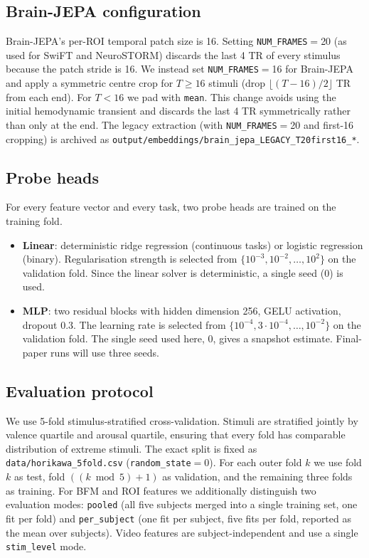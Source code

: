 \documentclass[11pt, a4paper]{article}
\newcommand{\fefn}[1]{\texttt{\small #1}}
\begin{document}
\subsection{Brain-JEPA configuration}
\label{sec:bjnote}

Brain-JEPA's per-ROI temporal patch size is 16. Setting \texttt{NUM\_FRAMES}$=$20 (as used
for SwiFT and NeuroSTORM) discards the last 4 TR of every stimulus because the patch
stride is 16. We instead set \texttt{NUM\_FRAMES}$=$16 for Brain-JEPA and apply a
symmetric centre crop for $T \geq 16$ stimuli (drop $\lfloor (T-16)/2 \rfloor$ TR from
each end). For $T < 16$ we pad with \texttt{mean}. This change avoids using the initial
hemodynamic transient and discards the last 4 TR symmetrically rather than only at the
end. The legacy extraction (with \texttt{NUM\_FRAMES}$=$20 and first-16 cropping) is
archived as \fefn{output/embeddings/brain\_jepa\_LEGACY\_T20first16\_*}.

\subsection{Probe heads}
For every feature vector and every task, two probe heads are trained on the training fold.

\begin{itemize}[leftmargin=1.4em, itemsep=2pt]
  \item \textbf{Linear}: deterministic ridge regression (continuous tasks) or logistic
        regression (binary). Regularisation strength is selected from
        $\{10^{-3}, 10^{-2}, \ldots, 10^{2}\}$ on the validation fold. Since the linear
        solver is deterministic, a single seed (0) is used.
  \item \textbf{MLP}: two residual blocks with hidden dimension 256, GELU activation,
        dropout 0.3. The learning rate is selected from
        $\{10^{-4}, 3\!\cdot\!10^{-4}, \ldots, 10^{-2}\}$ on the validation fold. The
        single seed used here, 0, gives a snapshot estimate. Final-paper runs will use
        three seeds.
\end{itemize}

\subsection{Evaluation protocol}
We use 5-fold stimulus-stratified cross-validation. Stimuli are stratified jointly by
valence quartile and arousal quartile, ensuring that every fold has comparable distribution
of extreme stimuli. The exact split is fixed as \fefn{data/horikawa\_5fold.csv}
(\texttt{random\_state}$=$0). For each outer fold $k$ we use fold $k$ as test, fold
$((k \bmod 5) + 1)$ as validation, and the remaining three folds as training. For BFM and
ROI features we additionally distinguish two evaluation modes: \texttt{pooled} (all five
subjects merged into a single training set, one fit per fold) and \texttt{per\_subject}
(one fit per subject, five fits per fold, reported as the mean over subjects). Video
features are subject-independent and use a single \texttt{stim\_level} mode.
\end{document}
